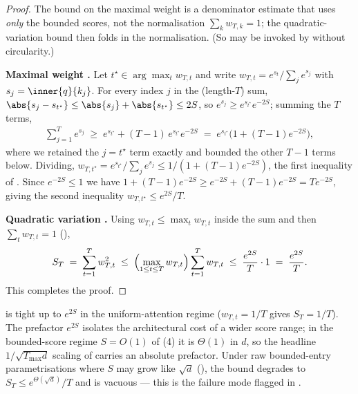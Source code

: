 \begin{proof}
The bound  on the maximal weight is a denominator
estimate that uses \emph{only} the bounded scores, not the normalisation
$\sum_k w_{T,k}=1$; the quadratic-variation bound  then
folds in the normalisation. (So  may be invoked by
 without circularity.)

\smallskip\noindent\textbf{Maximal weight .} Let
$t^\star\in\arg\max_t w_{T,t}$ and write $w_{T,t}=e^{s_t}/\sum_{j} e^{s_j}$
with $s_j=\inner{q}{k_j}$. For every index $j$ in the (length-$T$) sum,
$\abs{s_j-s_{t^\star}}\le\abs{s_j}+\abs{s_{t^\star}}\le2S$, so
$e^{s_j}\ge e^{s_{t^\star}}e^{-2S}$; summing the $T$ terms,
\begin{align*}
   \sum_{j=1}^{T} e^{s_j}
   \;\ge\; e^{s_{t^\star}} + (T-1)\,e^{s_{t^\star}}e^{-2S}
   \;=\; e^{s_{t^\star}}\bigl(1+(T-1)e^{-2S}\bigr),
\end{align*}
where we retained the $j=t^\star$ term exactly and bounded the other $T-1$
terms below. Dividing, $w_{T,t^\star}=e^{s_{t^\star}}/\sum_j e^{s_j}\le1/(1+(T-1)e^{-2S})$,
the first inequality of . Since $e^{-2S}\le1$ we have
$1+(T-1)e^{-2S}\ge e^{-2S}+(T-1)e^{-2S}=Te^{-2S}$, giving the second
inequality $w_{T,t^\star}\le e^{2S}/T$.

\smallskip\noindent\textbf{Quadratic variation .} Using
$w_{T,t}\le\max_t w_{T,t}$ inside the sum and then
$\sum_t w_{T,t}=1$ (),
\begin{align*}
   S_T \;=\; \sum_{t=1}^{T} w_{T,t}^2
   \;\le\; \Bigl(\max_{1\le t\le T} w_{T,t}\Bigr)\sum_{t=1}^{T} w_{T,t}
   \;\le\; \frac{e^{2S}}{T}\cdot1
   \;=\; \frac{e^{2S}}{T}.
\end{align*}
This completes the proof.
\end{proof}

\begin{remark}
\label{rem:quad_variation_tightness}
 is tight up to $e^{2S}$ in the uniform-attention
regime ($w_{T,t}=1/T$ gives $S_T=1/T$). The prefactor $e^{2S}$ isolates
the architectural cost of a wider score range; in the bounded-score
regime $S=O(1)$ of (4) it is $\Theta(1)$
in $d$, so the headline $1/\sqrt{T_{\max}d}$ scaling of 
carries an absolute prefactor. Under raw bounded-entry parametrisations
where $S$ may grow like $\sqrt d$ (), the
bound degrades to $S_T\le e^{\Theta(\sqrt d)}/T$ and is vacuous — this is
the failure mode flagged in .
\end{remark}
